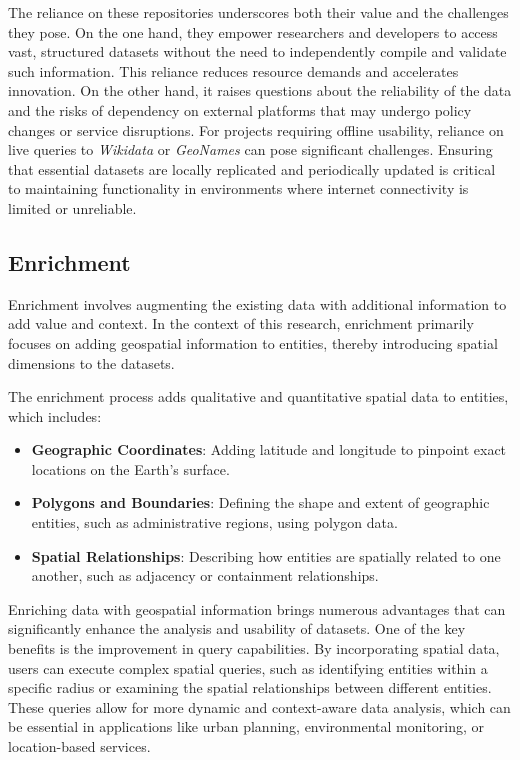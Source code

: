 The reliance on these repositories underscores both their value and the challenges they pose. On the one hand, they empower researchers and developers to access vast, structured datasets without the need to independently compile and validate such information. This reliance reduces resource demands and accelerates innovation. On the other hand, it raises questions about the reliability of the data and the risks of dependency on external platforms that may undergo policy changes or service disruptions. For projects requiring offline usability, reliance on live queries to \textit{Wikidata} or \textit{GeoNames} can pose significant challenges. Ensuring that essential datasets are locally replicated and periodically updated is critical to maintaining functionality in environments where internet connectivity is limited or unreliable.

\subsection{Enrichment}\label{VI-subsec:enrichment}

Enrichment involves augmenting the existing data with additional information to add value and context. In the context of this research, enrichment primarily focuses on adding geospatial information to entities, thereby introducing spatial dimensions to the datasets.


The enrichment process adds qualitative and quantitative spatial data to entities, which includes:

\begin{itemize}
    \item \textbf{Geographic Coordinates}: Adding latitude and longitude to pinpoint exact locations on the Earth's surface.
    \item \textbf{Polygons and Boundaries}: Defining the shape and extent of geographic entities, such as administrative regions, using polygon data.
    \item \textbf{Spatial Relationships}: Describing how entities are spatially related to one another, such as adjacency or containment relationships.
\end{itemize}

Enriching data with geospatial information brings numerous advantages that can significantly enhance the analysis and usability of datasets. One of the key benefits is the improvement in query capabilities. By incorporating spatial data, users can execute complex spatial queries, such as identifying entities within a specific radius or examining the spatial relationships between different entities. These queries allow for more dynamic and context-aware data analysis, which can be essential in applications like urban planning, environmental monitoring, or location-based services.

